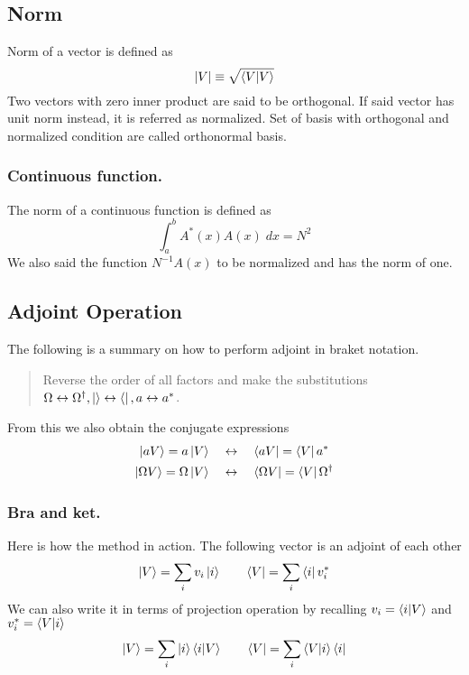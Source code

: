 \documentclass[../main.tex]{subfiles}
\begin{document}
\subsection*{Norm}
Norm of a vector is defined as
\begin{equation*}
	|V|\equiv\sqrt{\braket{V|V}}
\end{equation*}
Two vectors with zero inner product are said to be orthogonal.
If said vector has unit norm instead, it is referred as normalized.
Set of basis with orthogonal and normalized condition are called orthonormal basis.

\subsubsection*{Continuous function.}
The norm of a continuous function is defined as
\begin{equation*}
	\int_{a}^{b}A^*(x)A(x)\;dx=N^2
\end{equation*}
We also said the function $N^{-1}A(x)$ to be normalized and has the norm of one.

\subsection*{Adjoint Operation}
The following is a summary on how to perform adjoint in braket notation.
\begin{quotation}
	Reverse the order of all factors and make the substitutions $\Omega\leftrightarrow\Omega^\dagger,\ket{}\leftrightarrow \bra{}, a\leftrightarrow a^*$.
\end{quotation}
From this we also obtain the conjugate expressions
\begin{align*}
	\ket{aV}=a \ket{V}\quad            & \leftrightarrow \quad\bra{aV}=\bra{V}a^*                 \\
	\ket{\Omega V}=\Omega \ket{V}\quad & \leftrightarrow\quad\bra{\Omega V}=\bra{V}\Omega^\dagger
\end{align*}

\subsubsection*{Bra and ket.}
Here is how the method in action.
The following vector is an adjoint of each other
\begin{equation*}
	\ket{V}=\sum_iv_i \ket{i}\qquad \bra{V}=\sum_i \bra{i}v_i^*
\end{equation*}
We can also write it in terms of projection operation by recalling $v_i=\braket{i|V}$ and $v_i^*=\braket{V|i}$
\begin{equation*}
	\ket{V}=\sum_i \ket{i} \braket{i|V}\qquad \bra{V}=\sum_i \braket{V|i}\bra{i}
\end{equation*}
\end{document}
